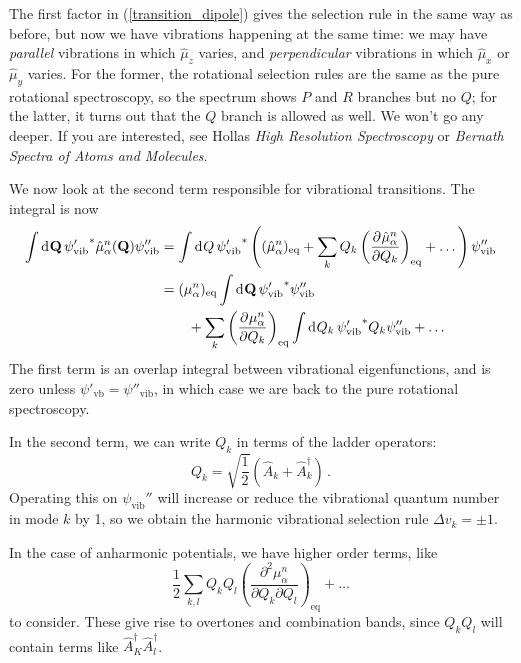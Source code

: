 \documentclass{article}
\theoremstyle{plain}\theoremheaderfont{\normalfont\itshape}\theorembodyfont{\rmfamily}\theoremseparator{.}\newtheorem*{rem}{Remark}\newtheorem*{ex}{Example}\newtheorem*{proof}{Proof}\newtheorem*{altp}{Alternative proof}
\theoremstyle{plain}\theoremheaderfont{\normalfont\bfseries}\theorembodyfont{\rmfamily}\theoremseparator{.}\newtheorem{thm}{Theorem}[section]\newtheorem{lem}[thm]{Lemma}\newtheorem{prop}[thm]{Proposition}\newtheorem*{cor}{Corollary}\newtheorem{defn}[thm]{Definition}\newtheorem{clm}[thm]{Claim}\newtheorem{clminproof}{Claim}\newtheorem*{law}{Law}\newtheorem{pos}[thm]{Postulate}
\theoremstyle{break}\theoremheaderfont{\normalfont\itshape}\theorembodyfont{\rmfamily}\theoremseparator{.\medskip}\newtheorem*{proofskip}{Proof}\newtheorem*{exs}{Examples}\newtheorem*{rems}{Remarks}
\theoremstyle{break}\theoremheaderfont{\normalfont\bfseries}\theorembodyfont{\rmfamily}\theoremseparator{.\medskip}\newtheorem{lemskip}[thm]{Lemma}\newtheorem{defnskip}[thm]{Definition}\newtheorem{propskip}[thm]{Proposition}\newtheorem{thmskip}[thm]{Theorem}
\numberwithin{equation}{section}
\newcommand{\dd}[2][]{\mathrm{d}^{#1} #2\,}
\newcommand{\pdv}[3][]{\frac{\partial^{#1} #2}{{\partial #3}^{#1}}}
\newcommand{\vb}[1]{\bm{\mathrm{#1}}}
\begin{document}
    The first factor in (\ref{transition_dipole}) gives the selection rule in the same way as before, but now we have vibrations happening at the same time: we may have \textit{parallel} vibrations in which \(\hat{\mu}_z\) varies, and \textit{perpendicular} vibrations in which \(\hat{\mu}_x\) or \(\hat{\mu}_y\) varies. For the former, the rotational selection rules are the same as the pure rotational spectroscopy, so the spectrum shows \(P\) and \(R\) branches but no \(Q\); for the latter, it turns out that the \(Q\) branch is allowed as well. We won't go any deeper. If you are interested, see Hollas \textit{High Resolution Spectroscopy} or \textit{Bernath} \textit{Spectra of Atoms and Molecules}.

    We now look at the second term responsible for vibrational transitions. The integral is now
    \begin{align}
        \int\dd{\vb{Q}}{\psi_{\text{vib}}'}^*\hat{\mu}_\alpha^n(\vb{Q})\psi_{\text{vib}}''&=\int\dd{Q}{\psi_{\text{vib}}'}^*\left((\hat{\mu}_\alpha^n)_{\text{eq}}+\sum_k Q_k\left(\pdv{\hat{\mu}_\alpha^n}{Q_k}\right)_{\text{eq}}+\dots\right)\psi_{\text{vib}}''\notag\\
        &=(\mu_\alpha^n)_{\text{eq}}\int\dd{\vb{Q}}{\psi_{\text{vib}}'}^*\psi_{\text{vib}}''\notag\\
        &\qquad +\sum_k\left(\pdv{\mu_\alpha^n}{Q_k}\right)_{\text{eq}}\int\dd{Q_k}{\psi_{\text{vib}}'}^*Q_k\psi_{\text{vib}}''+\dots
    \end{align}
    The first term is an overlap integral between vibrational eigenfunctions, and is zero unless \(\psi'_{\text{vb}}=\psi''_{\text{vib}}\), in which case we are back to the pure rotational spectroscopy.

    In the second term, we can write \(Q_k\) in terms of the ladder operators:
    \begin{equation}
        Q_k=\sqrt{\frac{1}{2}}(\hat{A}_k+\hat{A}_k^\dagger)\,.
    \end{equation}
    Operating this on \(\psi_{\text{vib}}''\) will increase or reduce the vibrational quantum number in mode \(k\) by 1, so we obtain the harmonic vibrational selection rule \(\Delta v_k=\pm 1\).

    In the case of anharmonic potentials, we have higher order terms, like
    \begin{equation}
        \frac{1}{2}\sum_{k,l}Q_kQ_l\left(\frac{\partial^2 \mu_\alpha^n}{\partial Q_k\partial Q_l}\right)_{\text{eq}}+\dots
    \end{equation}
    to consider. These give rise to overtones and combination bands, since \(Q_k Q_l\) will contain terms like \(\hat{A}_K^\dagger\hat{A}_l^\dagger\).
\end{document}
